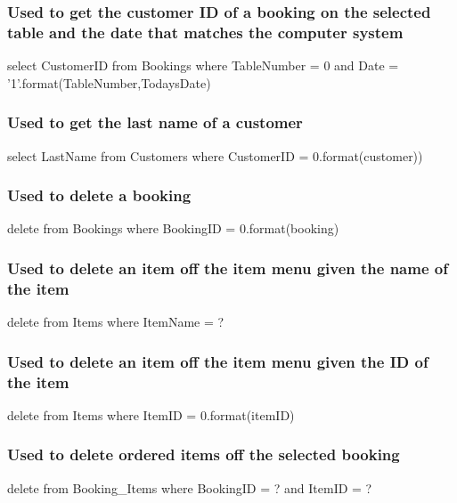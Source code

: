 \subsubsection{Used to get the customer ID of a booking on the selected table and the date that matches the computer system}
\begin{sql}
select CustomerID from Bookings where TableNumber = {0} and Date = '{1}'.format(TableNumber,TodaysDate)
\end{sql}

\subsubsection{Used to get the last name of a customer}

\begin{sql}
select LastName from Customers where CustomerID = {0}.format(customer))
\end{sql}

\subsubsection{Used to delete a booking}
\begin{sql}
delete from Bookings where BookingID = {0}.format(booking)
\end{sql}

\subsubsection{Used to delete an item off the item menu given the name of the item}
\begin{sql}
delete from Items where ItemName = ?
\end{sql}

\subsubsection{Used to delete an item off the item menu given the ID of the item}
\begin{sql}
delete from Items where ItemID = {0}.format(itemID)
\end{sql}

\subsubsection{Used to delete ordered items off the selected booking}
\begin{sql}
delete from Booking_Items where BookingID = ? and ItemID = ? 
\end{sql}

